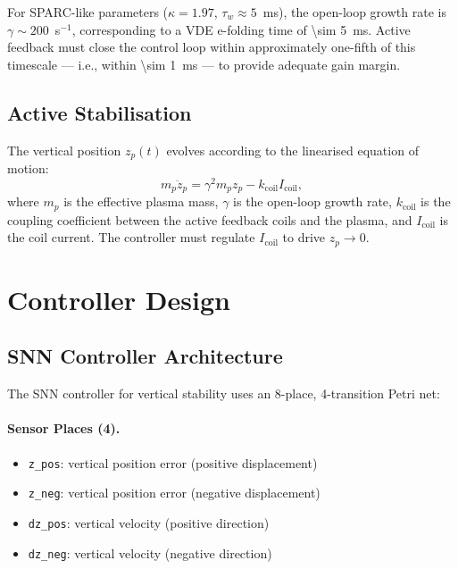 \documentclass[12pt]{article}
\newcommand{\code}[1]{\texttt{#1}}
\begin{document}
For SPARC-like parameters ($\kappa = 1.97$, $\tau_w \approx 5$~ms),
the open-loop growth rate is $\gamma \sim 200$~s$^{-1}$, corresponding
to a VDE e-folding time of \SI{\sim 5}{\milli\second}.  Active
feedback must close the control loop within approximately one-fifth of
this timescale --- i.e., within \SI{\sim 1}{\milli\second} --- to
provide adequate gain margin.

\subsection{Active Stabilisation}

The vertical position $z_p(t)$ evolves according to the linearised
equation of motion:
\begin{equation}
  m_p \ddot{z}_p = \gamma^2 m_p z_p - k_{\mathrm{coil}} I_{\mathrm{coil}},
  \label{eq:vertical-eom}
\end{equation}
where $m_p$ is the effective plasma mass, $\gamma$ is the open-loop
growth rate, $k_{\mathrm{coil}}$ is the coupling coefficient between
the active feedback coils and the plasma, and $I_{\mathrm{coil}}$ is
the coil current.  The controller must regulate $I_{\mathrm{coil}}$ to
drive $z_p \to 0$.


\section{Controller Design}
\label{sec:controller-design}

\subsection{SNN Controller Architecture}

The SNN controller for vertical stability uses an 8-place, 4-transition
Petri net:

\paragraph{Sensor Places (4).}
\begin{itemize}
  \item \code{z\_pos}: vertical position error (positive displacement)
  \item \code{z\_neg}: vertical position error (negative displacement)
  \item \code{dz\_pos}: vertical velocity (positive direction)
  \item \code{dz\_neg}: vertical velocity (negative direction)
\end{itemize}
\end{document}
